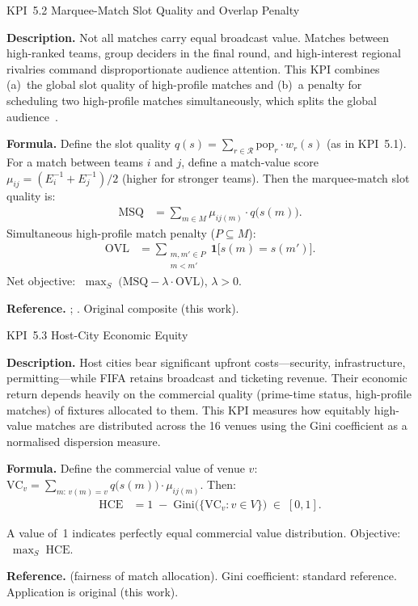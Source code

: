 \documentclass[12pt, letterpaper]{article}
\newcommand{\kpilabel}[1]{\noindent\textbf{#1}\enspace}
\begin{document}
\begin{kpibox}{KPI~5.2 \textendash{} Marquee-Match Slot Quality and Overlap Penalty}

\kpilabel{Description.}
Not all matches carry equal broadcast value.  Matches between high-ranked
teams, group deciders in the final round, and high-interest regional
rivalries command disproportionate audience attention.  This KPI
combines (a)~the global slot quality of high-profile matches and
(b)~a penalty for scheduling two high-profile matches simultaneously,
which splits the global audience~\citep{RibeiroUrrutia2007}.

\medskip
\kpilabel{Formula.}
Define the slot quality $q(s) =
\sum_{r \in \mathcal{R}} \mathrm{pop}_r \cdot w_r(s)$ (as in KPI~5.1).
For a match between teams $i$ and $j$, define a match-value score
$\mu_{ij} = (E_i^{-1} + E_j^{-1})/2$ (higher for stronger teams).
Then the marquee-match slot quality is:
\begin{align*}
  \mathrm{MSQ} &= \sum_{m \in M} \mu_{ij(m)} \cdot
    q\!\bigl(s(m)\bigr).
\end{align*}
Simultaneous high-profile match penalty ($P \subseteq M$):
\begin{align*}
  \mathrm{OVL} &= \sum_{\substack{m,m'\in P \\ m < m'}}
    \mathbf{1}\!\bigl[s(m) = s(m')\bigr].
\end{align*}
Net objective: $\;\displaystyle\max_{S}\;
\bigl(\mathrm{MSQ} - \lambda \cdot \mathrm{OVL}\bigr)$,
\quad $\lambda > 0$.

\medskip
\kpilabel{Reference.}
\citet{RibeiroUrrutia2007}; \citet{GuajardoKrumer2024}.
Original composite (this work).
\end{kpibox}

\begin{kpibox}{KPI~5.3 \textendash{} Host-City Economic Equity}

\kpilabel{Description.}
Host cities bear significant upfront costs---security, infrastructure,
permitting---while FIFA retains broadcast and ticketing revenue.  Their
economic return depends heavily on the commercial quality (prime-time
status, high-profile matches) of fixtures allocated to them.  This KPI
measures how equitably high-value matches are distributed across the 16
venues using the Gini coefficient as a normalised dispersion measure.

\medskip
\kpilabel{Formula.}
Define the commercial value of venue $v$:
$\mathrm{VC}_v = \sum_{m:\,v(m)=v}
q\!\bigl(s(m)\bigr)\cdot\mu_{ij(m)}$.  Then:
\begin{align*}
  \mathrm{HCE} &= 1 \;-\;
    \mathrm{Gini}\!\bigl(\{\mathrm{VC}_v : v \in V\}\bigr)
  \;\in\; [0,1].
\end{align*}
\vspace{-8pt}

\noindent
A value of~1 indicates perfectly equal commercial value distribution.
Objective: $\;\displaystyle\max_{S}\;\mathrm{HCE}$.

\medskip
\kpilabel{Reference.}
\citet{RibeiroUrrutia2007} (fairness of match allocation).
Gini coefficient: standard reference.  Application is original
(this work).
\end{kpibox}
\end{document}
